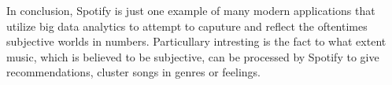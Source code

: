 
    In conclusion, Spotify is just one example of many modern applications that utilize big data analytics to attempt to caputure and reflect the oftentimes subjective worlds in numbers. 
    Particullary intresting is the fact to what extent music, which is believed to be subjective, can be processed by Spotify to give recommendations, cluster songs in genres or feelings. 



